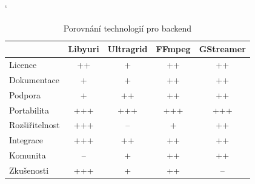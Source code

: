 \documentclass[thesis=M,czech]{FITthesis}[2012/06/26]
\begin{document}
\begin{table}[]
\catcode` %
\centering
\begin{tabular}{l|l|l|l|l|}
\cline{2-5}
\multicolumn{1}{c|}{}                & \multicolumn{1}{c|}{Libyuri} & \multicolumn{1}{c|}{Ultragrid} & \multicolumn{1}{c|}{FFmpeg} & \multicolumn{1}{c|}{GStreamer} \\ \hline
\multicolumn{1}{|l|}{Licence}        & \multicolumn{1}{c|}{++}      & \multicolumn{1}{c|}{+}         & \multicolumn{1}{c|}{++}                                     & \multicolumn{1}{c|}{++}        \\ \hline
\multicolumn{1}{|l|}{Dokumentace}    & \multicolumn{1}{c|}{+}       & \multicolumn{1}{c|}{+}         & \multicolumn{1}{c|}{++}                                      & \multicolumn{1}{c|}{++}        \\ \hline
\multicolumn{1}{|l|}{Podpora}        & \multicolumn{1}{c|}{+}       & \multicolumn{1}{c|}{++}        & \multicolumn{1}{c|}{++}                                      & \multicolumn{1}{c|}{++}        \\ \hline
\multicolumn{1}{|l|}{Portabilita}    & \multicolumn{1}{c|}{+++}     & \multicolumn{1}{c|}{+++}       & \multicolumn{1}{c|}{+++}                                    & \multicolumn{1}{c|}{+++}       \\ \hline
\multicolumn{1}{|l|}{Rozšiřitelnost} & \multicolumn{1}{c|}{+++}     & \multicolumn{1}{c|}{--}         & \multicolumn{1}{c|}{+}                                      & \multicolumn{1}{c|}{++}        \\ \hline
\multicolumn{1}{|l|}{Integrace}      & \multicolumn{1}{c|}{+++}     & \multicolumn{1}{c|}{++}        & \multicolumn{1}{c|}{++}                                     & \multicolumn{1}{c|}{++}        \\ \hline
\multicolumn{1}{|l|}{Komunita}       & \multicolumn{1}{c|}{--}       & \multicolumn{1}{c|}{+}         & \multicolumn{1}{c|}{++}                                     & \multicolumn{1}{c|}{++}        \\ \hline
\multicolumn{1}{|l|}{Zkušenosti}     & \multicolumn{1}{c|}{+++}     & \multicolumn{1}{c|}{+}         & \multicolumn{1}{c|}{++}                                     & \multicolumn{1}{c|}{--}         \\ \hline
\end{tabular}
\caption{Porovnání technologií pro backend}

\label{tbl:table_backend}
\end{table}
\end{document}
